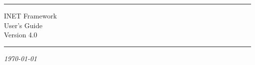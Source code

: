 

\begin{center}\end{center}
\vspace{16em}
\hrule
\vspace{2em}
\begin{center}
{\HUGE INET Framework}\\
\vspace{2em}
{\Huge User's Guide}\\
\vspace{2em}
{\Large Version 4.0}\\
\end{center}
\vspace{2em}
\hrule

\begin{center}
\textit{\today}
\end{center}




